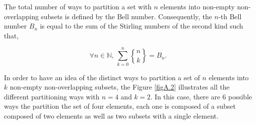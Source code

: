 The total number of ways to partition a set with $n$ elements into non-empty non-overlapping subsets is defined by the Bell number. Consequently, the $n$-th Bell number $B_{n}$ is equal to the sum of the Stirling numbers of the second kind such that,

\begin{equation} \label{eqnA.8}
\forall n \in \mathbb{N} ,\, \sum_{k=0}^{n} \genfrac{\{}{\}}{0pt}{0}{n}{k} = B_{n}.
\end{equation}

In order to have an idea of the distinct ways to partition a set of $n$ elements into $k$ non-empty non-overlapping subsets, the Figure \ref{figA.2} illustrates all the different partitioning ways with $n=4$ and $k=2$. In this case, there are $6$ possible ways the partition the set of four elements, each one is composed of a subset composed of two elements as well as two subsets with a single element.

